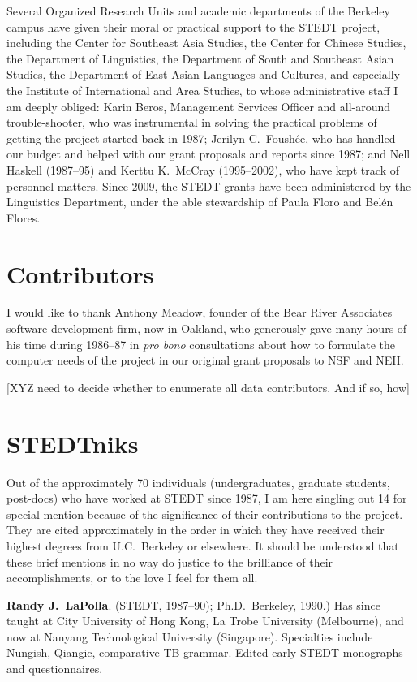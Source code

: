 Several Organized Research Units and academic departments of the Berkeley campus have given their moral or practical support to the STEDT project, including the Center for Southeast Asia Studies, the Center for Chinese Studies, the Department of Linguistics, the Department of South and Southeast Asian Studies, the Department of East Asian Languages and Cultures, and especially the Institute of International and Area Studies, to whose administrative staff I am deeply obliged: Karin Beros, Management Services Officer and all-around trouble-shooter, who was instrumental in solving the practical problems of getting the project started back in 1987; Jerilyn C.\ Foush\'ee, who has handled our budget and helped with our grant proposals and reports since 1987; and Nell Haskell (1987–95) and Kerttu K.\ McCray (1995–2002), who have kept track of personnel matters.  Since 2009, the STEDT grants have been administered by the Linguistics Department, under the able stewardship of Paula Floro and Bel\'en Flores.

\section{Contributors}

I would like to thank Anthony Meadow, founder of the Bear River Associates software development firm, now in Oakland, who generously gave many hours of his time during 1986–87 in {\it pro bono} consultations about how to formulate the computer needs of the project in our original grant proposals to NSF and NEH.

[XYZ need to decide whether to enumerate all data contributors. And if so, how]

\section{STEDTniks}

Out of the approximately 70 individuals (undergraduates, graduate students, post-docs) who have worked at STEDT since 1987, I am here singling out 14 for special mention because of the significance of their contributions to the project. They are cited approximately in the order in which they have received their highest degrees from U.C.\ Berkeley or elsewhere. It should be understood that these brief mentions in no way do justice to the brilliance of their accomplishments, or to the love I feel for them all.

\textbf{Randy J.\ LaPolla}. (STEDT, 1987–90); Ph.D.\ Berkeley, 1990.) Has since taught at City University of Hong Kong, La Trobe University (Melbourne), and now at Nanyang Technological University (Singapore). Specialties include Nungish, Qiangic, comparative TB grammar. Edited early STEDT monographs and questionnaires.

